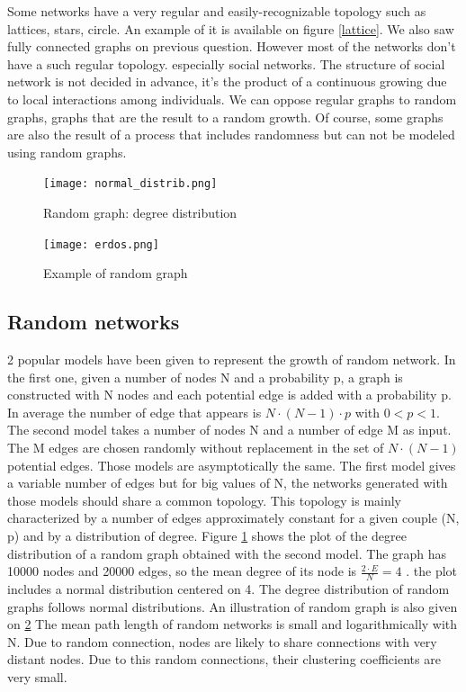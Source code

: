 \documentclass[a4paper, 12pt]{report}
\begin{document}
Some networks have a very regular and easily-recognizable topology such as lattices, stars, circle. An example of it is available on figure \ref{lattice}. We also saw fully connected graphs on previous question. However most of the networks don't have a such regular topology. especially social networks. The structure of social network is not decided in advance, it's the product of a continuous growing due to local interactions among individuals. We can oppose regular graphs to random graphs, graphs that are the result to a random growth. Of course, some graphs are also the result of a process that includes randomness but can not be modeled using random graphs.\\
\begin{figure}
\centering
\texttt{[image: normal\_distrib.png]}
\caption{Random graph: degree distribution}
\label{random}
\end{figure}

\begin{figure}
\centering
\texttt{[image: erdos.png]}
\caption{Example of random graph\citep{erdos_image}}
\label{erdos}
\end{figure}

\subsection{Random networks}
2 popular models have been given to represent the growth of random network. In the first one, given a number of nodes N and a probability p, a graph is constructed with N nodes and each potential edge is added with a probability p. In average the number of edge that appears is $N \cdot (N-1) \cdot p$ with $ 0< p <1$. The second model takes a number of nodes N and a number of edge M as input. The M edges are chosen randomly without replacement in the set of $N \cdot (N-1)$ potential edges. Those models are asymptotically the same. The first model gives a variable number of edges but for big values of N, the networks generated with those models should share a common topology. This topology is mainly characterized by a number of edges approximately constant for a given couple (N, p) and by a distribution of degree. Figure \ref{random} shows the plot of the degree distribution of a random graph obtained with the second model. The graph has 10000 nodes and 20000 edges, so the mean degree of its node is  $\frac{2 \cdot E}{N} = 4$ . the plot includes a normal distribution centered on 4. The degree distribution of random graphs follows normal distributions.  An illustration of random graph is also given on \ref{erdos} The mean path length of random networks is small and  logarithmically with N. Due to random connection, nodes are likely to share connections with very distant nodes. Due to this random connections, their clustering coefficients are very small.\\
\end{document}
